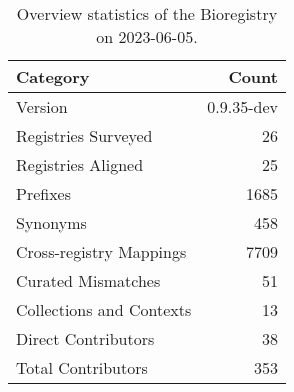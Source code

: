 \begin{table}
\caption{Overview statistics of the Bioregistry on 2023-06-05.}
\label{tab:bioregistry-summary}
\begin{tabular}{lr}
\toprule
Category & Count \\
\midrule
Version & 0.9.35-dev \\
Registries Surveyed & 26 \\
Registries Aligned & 25 \\
Prefixes & 1685 \\
Synonyms & 458 \\
Cross-registry Mappings & 7709 \\
Curated Mismatches & 51 \\
Collections and Contexts & 13 \\
Direct Contributors & 38 \\
Total Contributors & 353 \\
\bottomrule
\end{tabular}
\end{table}
